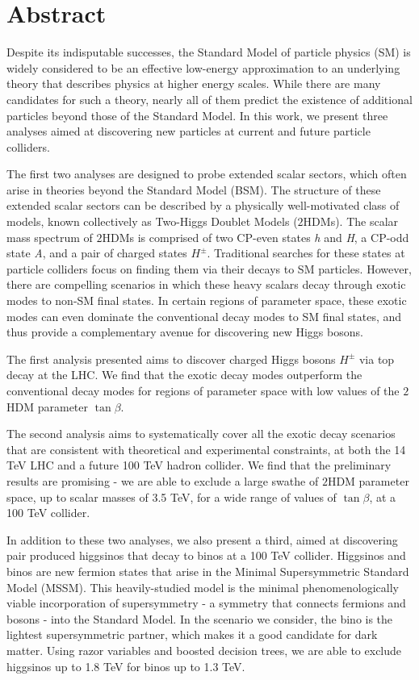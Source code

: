 \chapter*{Abstract}
Despite its indisputable successes, the Standard Model of particle physics (SM) is widely considered to be an effective low-energy approximation to an underlying theory that describes physics at higher energy scales. While there are many candidates for such a theory, nearly all of them predict the existence of additional particles beyond those of the Standard Model. In this work, we present three analyses aimed at discovering new particles at current and future particle colliders.

The first two analyses are designed to probe extended scalar sectors, which often arise in theories beyond the Standard Model (BSM). The structure of these extended scalar sectors can be described by a physically well-motivated class of models, known collectively as Two-Higgs Doublet Models ($2$HDMs). The scalar mass spectrum of $2$HDMs is comprised of two CP-even states \emph{h} and \emph{H}, a CP-odd state \emph{A}, and a pair of charged states $H^\pm$. Traditional searches for these states at particle colliders focus on finding them via their decays to SM particles. However, there are compelling scenarios in which these heavy scalars decay through exotic modes to non-SM final states. In certain regions of parameter space, these exotic modes can even dominate the conventional decay modes to SM final states, and thus provide a complementary avenue for discovering new Higgs bosons. 

The first analysis presented aims to discover charged Higgs bosons $H^\pm$ via top decay at the LHC. We find that the exotic decay modes outperform the conventional decay modes for regions of parameter space with low values of the $2$HDM parameter $\tan\beta$. 

The second analysis aims to systematically cover all the exotic decay scenarios that are consistent with theoretical and experimental constraints, at both the 14 TeV LHC and a future 100 TeV hadron collider. We find that the preliminary results are promising - we are able to exclude  a large swathe of $2$HDM parameter space, up to scalar masses of 3.5 TeV, for a wide range of values of $\tan\beta$, at a 100 TeV collider.

In addition to these two analyses, we also present a third, aimed at discovering pair produced higgsinos that decay to binos at a 100 TeV collider. Higgsinos and binos are new fermion states that arise in the Minimal Supersymmetric Standard Model (MSSM). This heavily-studied model is the minimal phenomenologically viable incorporation of supersymmetry - a symmetry that connects fermions and bosons - into the Standard Model. In the scenario we consider, the bino is the lightest supersymmetric partner, which makes it a good candidate for dark matter. Using razor variables and boosted decision trees, we are able to exclude higgsinos up to 1.8 TeV for binos up to 1.3 TeV.



